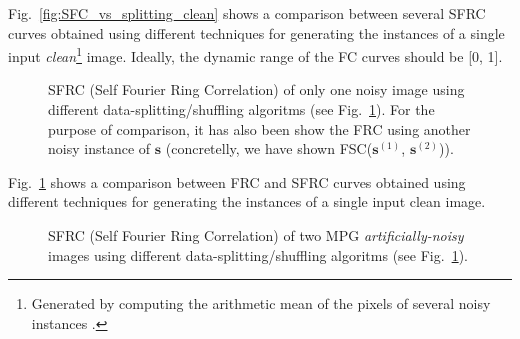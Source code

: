 \documentclass{article}
\begin{document}
Fig.~\ref{fig:SFC_vs_splitting_clean} shows a comparison between
several SFRC curves obtained using different techniques for generating
the instances of a single input \emph{clean}\footnote{Generated by
  computing the arithmetic mean of the pixels of several noisy
  instances \cite{zhang2019poisson}.} image. Ideally, the dynamic
range of the FC curves should be [0, 1].

\begin{figure}
  \centering
  \caption{SFRC (Self Fourier Ring Correlation) of only one noisy
    image \cite{zhang2019poisson} using different
    data-splitting/shuffling algoritms (see
    Fig.~\ref{fig:SFC_vs_splitting_noisy}). For the purpose of
    comparison, it has also been show the FRC using another noisy
    instance of $\mathbf{s}$ (concretelly, we have shown
    FSC($\mathbf{s}^{(1)}$,
    $\mathbf{s}^{(2)}$)).\label{fig:SFC_vs_splitting_noisy}}
\end{figure}

Fig.~\ref{fig:SFC_vs_splitting_noisy} shows a comparison between FRC
and SFRC curves obtained using different techniques for generating the
instances of a single input clean image.

\begin{figure}
  \centering
  \caption{SFRC (Self Fourier Ring Correlation) of two MPG
    \emph{artificially-noisy} images using different
    data-splitting/shuffling algoritms (see
    Fig.~\ref{fig:SFC_vs_splitting_noisy}).\label{fig:SFC_vs_splitting_artificial}}
\end{figure}
\end{document}
